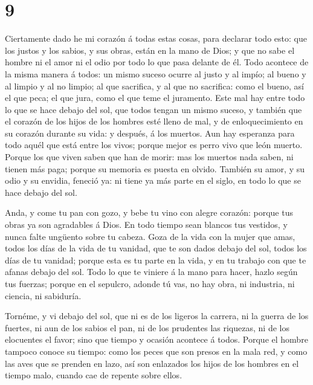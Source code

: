 \hypertarget{section-8}{%
\section{9}\label{section-8}}

 Ciertamente dado he mi corazón á todas estas cosas, para
declarar todo esto: que los justos y los sabios, y sus obras, están en
la mano de Dios; y que no sabe el hombre ni el amor ni el odio por todo
lo que pasa delante de él.  Todo acontece de la misma manera
á todos: un mismo suceso ocurre al justo y al impío; al bueno y al
limpio y al no limpio; al que sacrifica, y al que no sacrifica: como el
bueno, así el que peca; el que jura, como el que teme el juramento.
 Este mal hay entre todo lo que se hace debajo del sol, que
todos tengan un mismo suceso, y también que el corazón de los hijos de
los hombres esté lleno de mal, y de enloquecimiento en su corazón
durante su vida: y después, á los muertos.  Aun hay
esperanza para todo aquél que está entre los vivos; porque mejor es
perro vivo que león muerto.  Porque los que viven saben que
han de morir: mas los muertos nada saben, ni tienen más paga; porque su
memoria es puesta en olvido.  También su amor, y su odio y
su envidia, feneció ya: ni tiene ya más parte en el siglo, en todo lo
que se hace debajo del sol.

 Anda, y come tu pan con gozo, y bebe tu vino con alegre
corazón: porque tus obras ya son agradables á Dios.  En todo
tiempo sean blancos tus vestidos, y nunca falte ungüento sobre tu
cabeza.  Goza de la vida con la mujer que amas, todos los
días de la vida de tu vanidad, que te son dados debajo del sol, todos
los días de tu vanidad; porque esta es tu parte en la vida, y en tu
trabajo con que te afanas debajo del sol.  Todo lo que te
viniere á la mano para hacer, hazlo según tus fuerzas; porque en el
sepulcro, adonde tú vas, no hay obra, ni industria, ni ciencia, ni
sabiduría.

 Tornéme, y vi debajo del sol, que ni es de los ligeros la
carrera, ni la guerra de los fuertes, ni aun de los sabios el pan, ni de
los prudentes las riquezas, ni de los elocuentes el favor; sino que
tiempo y ocasión acontece á todos.  Porque el hombre
tampoco conoce su tiempo: como los peces que son presos en la mala red,
y como las aves que se prenden en lazo, así son enlazados los hijos de
los hombres en el tiempo malo, cuando cae de repente sobre ellos.


